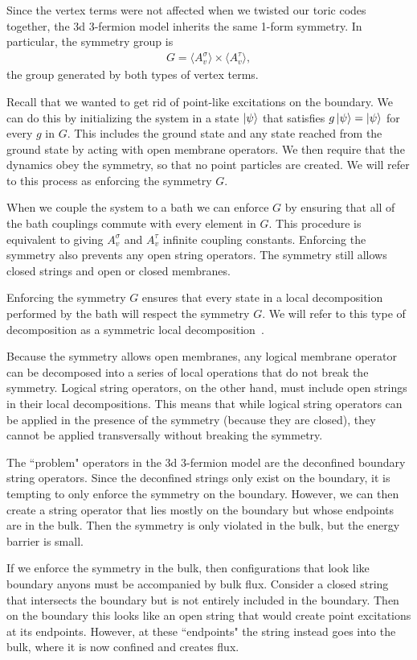 Since the vertex terms were not affected when we twisted our toric codes together, the 3d 3-fermion model inherits the same 1-form symmetry. In particular, the symmetry group is 
\begin{align}
G = \langle A_v^\sigma\rangle \times \langle A_v^\tau \rangle,
\end{align}
the group generated by both types of vertex terms.

Recall that we wanted to get rid of point-like excitations on the boundary. We can do this by initializing the system in a state $\ket{\psi}$ that satisfies $g\ket{\psi}=\ket{\psi}$ for every $g$ in $G$. This includes the ground state and any state reached from the ground state by acting with open membrane operators. We then require that the dynamics obey the symmetry, so that no point particles are created. We will refer to this process as enforcing the symmetry $G$.

When we couple the system to a bath we can enforce $G$ by ensuring that all of the bath couplings commute with every element in $G$. This procedure is equivalent to giving $A_v^\sigma$ and $A_v^\tau$ infinite coupling constants. Enforcing the symmetry also prevents any open string operators. The symmetry still allows closed strings and open or closed membranes. 

Enforcing the symmetry $G$ ensures that every state in a local decomposition performed by the bath will respect the symmetry $G$. We will refer to this type of decomposition as a symmetric local decomposition~\cite{RobertsBartlett2020}.

Because the symmetry allows open membranes, any logical membrane operator can be decomposed into a series of local operations that do not break the symmetry. Logical string operators, on the other hand, must include open strings  in their local decompositions. This means that while logical string operators can be applied in the presence of the symmetry (because they are closed), they cannot be applied transversally without breaking the symmetry.

The ``problem" operators in the 3d 3-fermion model are the deconfined boundary string operators. 
Since the deconfined strings only exist on the boundary, it is tempting to only enforce the symmetry on the boundary. However, we can then create a string operator that lies mostly on the boundary but whose endpoints are in the bulk. Then the symmetry is only violated in the bulk, but the energy barrier is small.

If we enforce the symmetry in the bulk, then configurations that look like boundary anyons must be accompanied by bulk flux. Consider a closed string that intersects the boundary but is not entirely included in the boundary. Then on the boundary this looks like an open string that would create point excitations at its endpoints. However, at these   ``endpoints" the string instead goes into the bulk, where it is now confined and creates flux.

